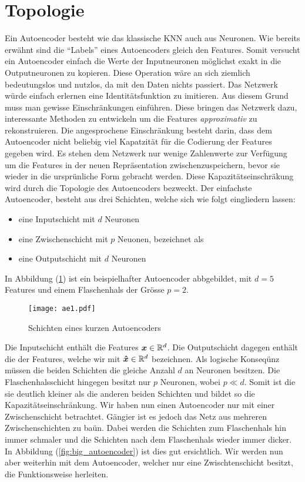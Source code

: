 \section{Topologie}
Ein Autoencoder besteht wie das klassische KNN auch aus Neuronen.
Wie bereits erwähnt sind die ``Labels'' eines Autoencoders gleich
den Features. Somit versucht ein Autoencoder einfach die Werte der Inputneuronen
möglichst exakt in die Outputneuronen zu kopieren.
Diese Operation wäre an sich ziemlich bedeutungslos und nutzlos, da mit den
Daten nichts passiert. Das Netzwerk würde einfach erlernen eine
Identitätsfunktion zu imitieren.
Aus diesem Grund muss man gewisse Einschränkungen einführen. Diese bringen das Netzwerk dazu,
interessante Methoden zu entwickeln um die Features \textit{approximativ} zu rekonstruieren.
\para{}
Die angesprochene Einschränkung besteht darin, dass dem Autoencoder nicht
beliebig viel Kapatzität für die Codierung der Features gegeben wird.
Es stehen dem Netzwerk nur wenige Zahlenwerte zur Verfügung um die Features
in der neuen Repräsentation zwischenzuspeichern, bevor sie wieder in die ursprünliche Form gebracht werden.
Diese Kapazitätseinschräkung wird durch die Topologie des Autoencoders bezweckt.
\para{}
\bigskip
Der einfachste Autoencoder, besteht aus drei Schichten, welche sich wie folgt
eingliedern lassen:
\begin{itemize}
\item{eine Inputschicht mit $d$ Neuronen}
\item{eine Zwischenschicht mit $p$ Neuonen, bezeichnet als }
\item{eine Outputschicht mit $d$ Neuronen}
\end{itemize}
In Abbildung (\ref{fig:basic_autoencoder}) ist
ein beispielhafter Autoencoder abbgebildet, mit $d = 5$ Features und einem
Flaschenhals der Grösse $p = 2$.
\begin{figure}[h!]
  \centering
  \texttt{[image: ae1.pdf]}
  \caption{Schichten eines kurzen Autoencoders}
  \label{fig:basic_autoencoder}
\end{figure}
\para{}
Die Inputschicht enthält die Features $\bm{x} \in \mathbb{R}^d$. Die Outputschicht dagegen
enthält die  der Features, welche wir mit $\bm{\hat{x}} \in \mathbb{R}^d$
bezeichnen. Als logische Konseqünz müssen die beiden Schichten die gleiche
Anzahl $d$ an Neuronen besitzen.
Die Flaschenhalsschicht hingegen besitzt nur $p$ Neuronen, wobei $p \ll d$.
Somit ist die sie deutlich kleiner als die anderen beiden Schichten und bildet
so die Kapazitätseinschränkung.
\para{}
Wir haben nun einen Autoencoder nur mit einer Zwischenschicht betrachtet.
Gängier ist es jedoch das Netz aus mehreren Zwischenschichten zu baün. Dabei
werden die Schichten zum Flaschenhals hin immer schmaler und die Schichten nach
dem Flaschenhals wieder immer dicker. In Abbildung (\ref{fig:big_autoencoder})
ist dies gut ersichtlich. Wir werden nun aber weiterhin mit dem Autoencoder,
welcher nur eine Zwischtenschicht besitzt, die Funktionsweise herleiten.


